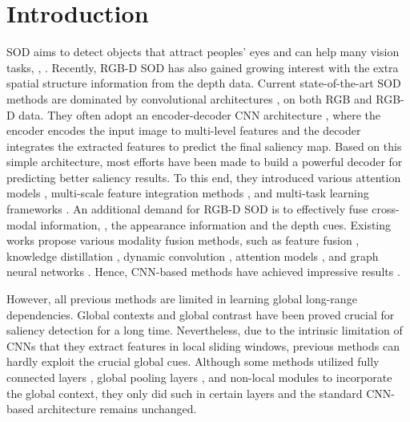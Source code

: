 \documentclass[10pt,twocolumn,letterpaper]{article}
\begin{document}
\section{Introduction}
SOD aims to detect objects that attract peoples' eyes and can help many vision tasks, \eg, \cite{shimoda2016distinct,gan2015devnet}.
Recently, RGB-D SOD has also gained growing interest with the extra spatial structure information from the depth data.
Current state-of-the-art SOD methods are dominated by convolutional architectures \cite{lecun1998gradient}, on both RGB and RGB-D data. They often adopt an encoder-decoder CNN architecture \cite{noh2015learning,ronneberger2015unet}, where the encoder encodes the input image to multi-level features and the decoder integrates the extracted features to predict the final saliency map. Based on this simple architecture, most efforts have been made to build a powerful decoder for predicting better saliency results. To this end, they introduced various attention models \cite{liu2018picanet,zhang2018pagr,chen2020dpanet}, multi-scale feature integration methods \cite{hou2018dss,MINet-CVPR2020,fan2020bbsnet,luo2020Cas-Gnn}, and multi-task learning frameworks \cite{wang2018salient,zhang2019capsal,zhao2019EGNet,CVPR2020_LDF,Wei2020CoNet}. An additional demand for RGB-D SOD is to effectively fuse cross-modal information, \ie, the appearance information and the depth cues. Existing works propose various modality fusion methods, such as feature fusion \cite{han2017cnns,chen2018progressively,fan2020bbsnet,Fu2020JLDCF,specificity_rgbd_sod}, knowledge distillation \cite{piao2020a2dele}, dynamic convolution \cite{HDFNet-ECCV2020}, attention models \cite{Li2020CMWNet,zhang2020ATSA}, and graph neural networks \cite{luo2020Cas-Gnn}.
Hence, CNN-based methods have achieved impressive results \cite{wang2019salient1,zhou2021rgb}.

However, all previous methods are limited in learning global long-range dependencies. Global contexts \cite{goferman2011context,zhao2015saliency,ren2015exploiting,luo2017non,liu2018picanet} and global contrast \cite{zhai2006visual,borji2012exploiting,cheng2014global} have been proved crucial for saliency detection for a long time. Nevertheless, due to the intrinsic limitation of CNNs that they extract features in local sliding windows, previous methods can hardly exploit the crucial global cues.
Although some methods utilized fully connected layers \cite{liu2016dhsnet,han2017cnns}, global pooling layers \cite{luo2017non,liu2018picanet,wang2017stagewise}, and non-local modules \cite{liu2020S2MA,chen2020dpanet} to incorporate the global context, they only did such in certain layers and the standard CNN-based architecture remains unchanged.
\end{document}
